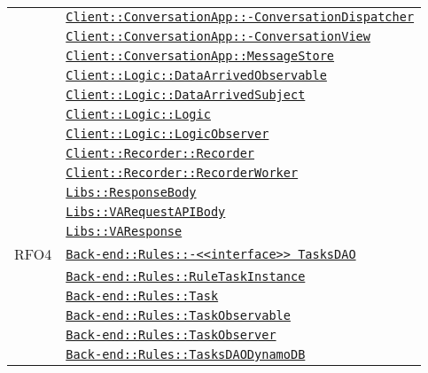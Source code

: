 \begin{longtable}{|>{\centering}m{3cm}|m{10cm}<{\centering}|}
& \hyperref[Client::ConversationApp::ConversationDispatcher]{\texttt{Client::ConversationApp::-\linebreak ConversationDispatcher}}\\
& \hyperref[Client::ConversationApp::ConversationView]{\texttt{Client::ConversationApp::-\linebreak ConversationView}}\\
& \hyperref[Client::ConversationApp::MessageStore]{\texttt{Client::ConversationApp::MessageStore}}\\
& \hyperref[Client::Logic::DataArrivedObservable]{\texttt{Client::Logic::DataArrivedObservable}}\\
& \hyperref[Client::Logic::DataArrivedSubject]{\texttt{Client::Logic::DataArrivedSubject}}\\
& \hyperref[Client::Logic::Logic]{\texttt{Client::Logic::Logic}}\\
& \hyperref[Client::Logic::LogicObserver]{\texttt{Client::Logic::LogicObserver}}\\
& \hyperref[Client::Recorder::Recorder]{\texttt{Client::Recorder::Recorder}}\\
& \hyperref[Client::Recorder::RecorderWorker]{\texttt{Client::Recorder::RecorderWorker}}\\
& \hyperref[Libs::ResponseBody]{\texttt{Libs::ResponseBody}}\\
& \hyperref[Libs::VARequestAPIBody]{\texttt{Libs::VARequestAPIBody}}\\
& \hyperref[Libs::VAResponse]{\texttt{Libs::VAResponse}}\\ \hline

RFO4 & \hyperref[Back-end::Rules::<<interface>> TasksDAO]{\texttt{Back-end::Rules::-\linebreak <<interface>> TasksDAO}}\\
& \hyperref[Back-end::Rules::RuleTaskInstance]{\texttt{Back-end::Rules::RuleTaskInstance}}\\
& \hyperref[Back-end::Rules::Task]{\texttt{Back-end::Rules::Task}}\\
& \hyperref[Back-end::Rules::TaskObservable]{\texttt{Back-end::Rules::TaskObservable}}\\
& \hyperref[Back-end::Rules::TaskObserver]{\texttt{Back-end::Rules::TaskObserver}}\\
& \hyperref[Back-end::Rules::TasksDAODynamoDB]{\texttt{Back-end::Rules::TasksDAODynamoDB}}\\ \hline


\end{longtable}
